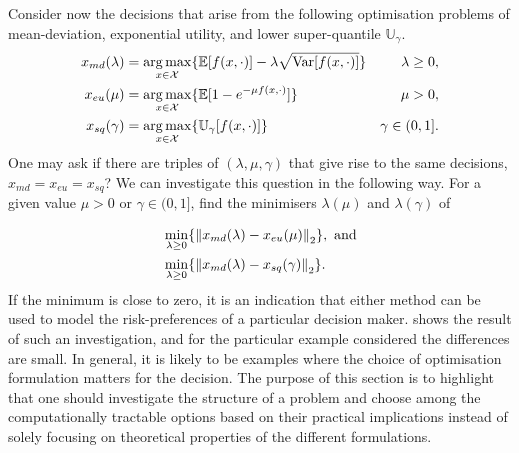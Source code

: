 \documentclass[main.tex]{subfiles}
\begin{document}
Consider now the decisions that arise from the following
optimisation problems of mean-deviation, exponential utility, and
lower super-quantile $\mathbb{U}_\gamma$.
\begin{subequations}\label{eq:optim_formulations}
  \begin{align}
    x_{md}(\lambda)
    &=\operatorname*{arg\,max}_{x\in\mathcal{X}}\{\mathbb
      E[f(x,\cdot)]-\lambda\sqrt{\mbox{Var}[f(x,\cdot)]}\}
    &\lambda\geq 0,\\
    x_{eu}(\mu)
    &=\operatorname*{arg\,max}_{x\in\mathcal{X}}\{
      \mathbb{E}[1-e^{-\mu f(x,\cdot)}]\}
    &\mu>0,\\
    x_{sq}(\gamma)
    &=\operatorname*{arg\,max}_{x\in\mathcal{X}}
      \{\mathbb{U}_\gamma[f(x,\cdot)]\}
    &\gamma\in(0,1].
  \end{align}
\end{subequations}
One may ask if there are triples of $(\lambda,\mu,\gamma)$ that give rise
to the same decisions, $x_{md}=x_{eu}=x_{sq}$?
We can investigate this question in the following way.
For a given value $\mu>0$ or $\gamma\in(0,1]$, find the minimisers
$\lambda(\mu)$ and $\lambda(\gamma)$ of

\begin{subequations}\label{eq:min_xmd_xeu_xsq}
  \begin{align}
    \label{eq:min_xmd_xeu}
    &\min_{\lambda\geq 0}\{{\|x_{md}(\lambda)-x_{eu}(\mu)\|}_2\},
      \textnormal{ and}\\
    &\min_{\lambda\geq 0}\{{\|x_{md}(\lambda)-x_{sq}(\gamma)\|}_2\}.
  \end{align}
\end{subequations}
If the minimum is close to zero, it is an indication that either method
can be used to model the risk-preferences of a particular decision maker.
 shows the result of such an investigation,
and for the particular example considered the differences are small.
In general, it is likely to be examples where the choice of
optimisation formulation matters for the decision. The purpose of this
section is to highlight that one should investigate the structure of
a problem and choose among the computationally tractable options based
on their practical implications instead of solely focusing on
theoretical properties of the different formulations.
\end{document}
